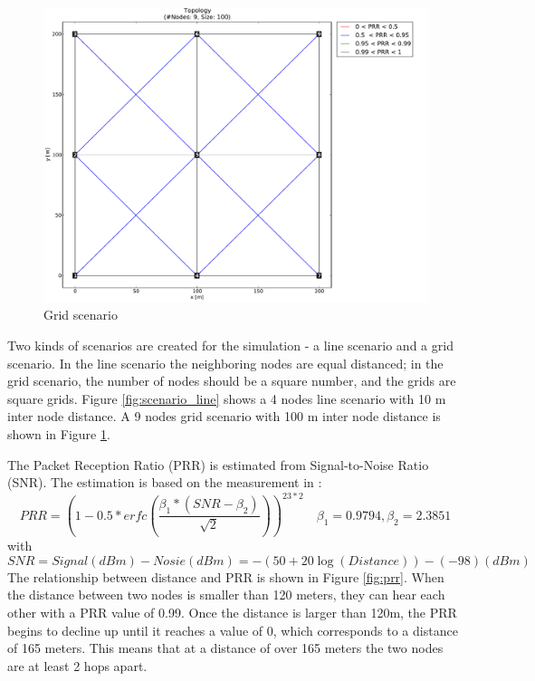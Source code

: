 \begin{figure}[!ht]	
  	\centering
    \leavevmode
      \includegraphics[scale=0.35]{Pics/results/topo9_dist100_grid.pdf}
    \caption{Grid scenario}
    \label{fig:scenario_grid}
\end{figure}

Two kinds of scenarios are created for the simulation - a line scenario and a grid scenario. In the line scenario the neighboring nodes are equal distanced; in the grid scenario, the number of nodes should be a square number, and the grids are square grids. Figure \ref{fig:scenario_line} shows a 4 nodes line scenario with 10 m inter node distance. A 9 nodes grid scenario with 100 m inter node distance is shown in Figure \ref{fig:scenario_grid}.
\newline

The Packet Reception Ratio (PRR) is estimated from Signal-to-Noise Ratio (SNR). The estimation is based on the measurement in \cite{RL08}:
\[
PRR = (1-0.5*erfc(\frac{\beta_1*(SNR-\beta_2)}{\sqrt{2}}))^{23*2}
\quad{\beta_1} = 0.9794, {\beta_2} = 2.3851
\] 
with 
\[
SNR = Signal(dBm)- Nosie(dBm) = -(50 + 20 {\log}(Distance)) - (-98)(dBm)
\] 
The relationship between distance and PRR is shown in Figure \ref{fig:prr}. When the distance between two nodes is smaller than 120 meters, they can hear each other with a PRR value of 0.99. Once the distance is larger than 120m, the PRR begins to decline up until it reaches a value of 0, which corresponds to a distance of 165 meters. This means that at a distance of over 165 meters the two nodes are at least 2 hops apart.

